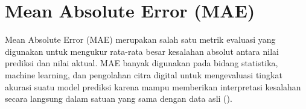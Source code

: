 




\section{Mean Absolute Error (MAE)}
  Mean Absolute Error (MAE) merupakan salah satu metrik evaluasi yang
digunakan untuk mengukur rata-rata besar kesalahan absolut antara nilai
prediksi dan nilai aktual. MAE banyak digunakan pada bidang statistika,
machine learning, dan pengolahan citra digital untuk mengevaluasi tingkat
akurasi suatu model prediksi karena mampu memberikan interpretasi kesalahan
secara langsung dalam satuan yang sama dengan data asli
(\textcite{Willmott2005}).

